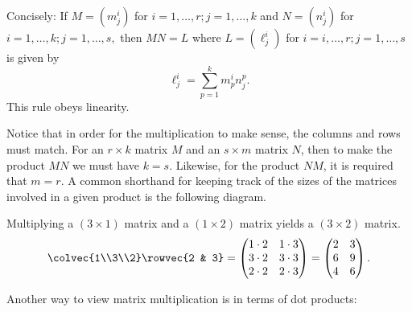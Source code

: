 Concisely: If \(M=(m^i_j)\) for \(i=1, \ldots, r; j=1, \ldots, k\) and \(N=(n^i_j)\) for \(i=1, \ldots, k; j=1, \ldots, s,\) then \(MN=L\) where \(L=(\ell^i_j)\) for \(i=i, \ldots, r; j=1, \ldots, s\) is given by
\[
\ell^i_j = \sum_{p=1}^k m^i_p n^p_j.
\]
This rule obeys linearity.

Notice that in order for the multiplication to make sense, the columns and rows must match.  For an $r\times k$ matrix $M$ and an $s\times m$ matrix $N$, then to make the product $MN$ we must have $k=s$.  Likewise, for the product $NM$, it is required that $m=r$.  A common shorthand for keeping track of the sizes of the matrices involved in a given product is the following diagram.



\begin{example}
Multiplying a $(3\times 1)$ matrix and a $(1\times 2)$ matrix yields a $(3\times 2)$ matrix.
\[
\colvec{1\\3\\2} \rowvec{2 & 3} = 
\begin{pmatrix}
1\cdot 2 & 1\cdot 3 \\
3\cdot 2 & 3\cdot 3 \\
2\cdot 2 & 2\cdot 3 \\
\end{pmatrix}
= \begin{pmatrix}
2 & 3 \\
6 & 9 \\
4 & 6 
\end{pmatrix} .
\]
\end{example}

Another way to view matrix multiplication is in terms of dot products:

\begin{center}
\end{center}



